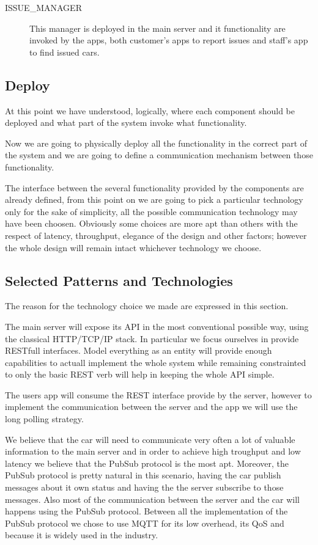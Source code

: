 \documentclass[11pt]{article} %
\begin{document}
\begin{description}
	\item[ISSUE\_MANAGER] This manager is deployed in the main server and it functionality are invoked by the apps, both customer's apps to report issues and staff's app to find issued cars.
\end{description}
	
\subsection{Deploy}

At this point we have understood, logically, where each component should be deployed and what part of the system invoke what functionality.

Now we are going to physically deploy all the functionality in the correct part of the system and we are going to define a communication mechanism between those functionality.

The interface between the several functionality provided by the components are already defined, from this point on we are going to pick a particular technology only for the sake of simplicity, all the possible communication technology may have been choosen. Obviously some choices are more apt than others with the respect of latency, throughput, elegance of the design and other factors; however the whole design will remain intact whichever technology we choose.

\subsection{Selected Patterns and Technologies}

The reason for the technology choice we made are expressed in this section.

The main server will expose its API in the most conventional possible way, using the classical HTTP/TCP/IP stack. In particular we focus ourselves in provide RESTfull interfaces. Model everything as an entity will provide enough capabilities to actuall implement the whole system while remaining constrainted to only the basic REST verb will help in keeping the whole API simple.

The users app will consume the REST interface provide by the server, however to implement the communication between the server and the app we will use the long polling strategy.

We believe that the car will need to communicate very often a lot of valuable information to the main server and in order to achieve high troughput and low latency we believe that the PubSub protocol is the most apt. Moreover, the PubSub protocol is pretty natural in this scenario, having the car publish messages about it own status and having the the server subscribe to those messages. Also most of the communication between the server and the car will happens using the PubSub protocol. Between all the implementation of the PubSub protocol we chose to use MQTT for its low overhead, its QoS and because it is widely used in the industry.
\end{document}
